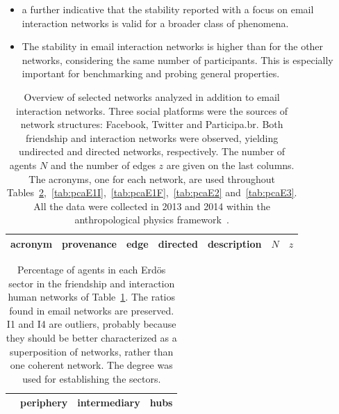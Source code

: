 \documentclass[%
 aip,
 jmp,%
 amsmath,amssymb,
 reprint,%
 floatfix,
]{revtex4-1}
\begin{document}
\begin{itemize}
	\item a further indicative that the stability reported with a focus on email interaction networks is valid for a broader class of phenomena.
	\item The stability in email interaction networks is higher than for the other networks, considering the same number of participants. This is especially important for benchmarking and probing general properties.
\end{itemize}

\begin{table}[!h]
	\caption{Overview of selected networks analyzed in addition to email interaction networks. Three social platforms were the sources of network structures: Facebook, Twitter and Participa.br. Both friendship and interaction networks were observed, yielding undirected and directed networks, respectively. The number of agents $N$ and the number of edges $z$ are given on the last columns. The acronyms, one for each network, are used throughout Tables~\ref{tab:secE},~\ref{tab:pcaE1I},~\ref{tab:pcaE1F},~\ref{tab:pcaE2} and~\ref{tab:pcaE3}. All the data were collected in 2013 and 2014 within the anthropological physics framework~\cite{anPhy}.}
\begin{center}
\begin{tabular}{| l | c | c | c | c | c | c | }\hline
	acronym & provenance & edge & directed & description & $N$ & $z$ \\ \hline\hline
	
\hline
\end{tabular}
\end{center}
\label{tab:E}
\end{table}


\begin{table}[!h]
	\caption{
	Percentage of agents in each Erd\"os sector in the friendship and interaction human networks of Table~\ref{tab:E}. The ratios found in email networks are preserved. I1 and I4 are outliers, probably because they should be better characterized as a superposition of networks, rather than one coherent network. The degree was used for establishing the sectors.
	}
\begin{center}
\begin{tabular}{| l | c | c | c |}\hline
	 & periphery & intermediary & hubs \\ \hline\hline
	
\hline
\end{tabular}
\end{center}
\label{tab:secE}
\end{table}
\end{document}
